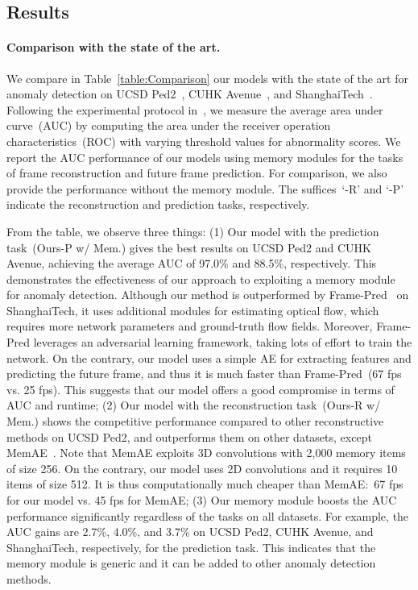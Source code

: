 \documentclass[10pt,twocolumn,letterpaper]{article}
\begin{document}
	\subsection{Results}
\vspace{-0.1cm}    
		\paragraph{Comparison with the state of the art.}
			We compare in Table~\ref{table:Comparison} our models with the state of the art for anomaly detection on UCSD Ped2~\cite{li2013anomaly}, CUHK Avenue~\cite{lu2013abnormal}, and ShanghaiTech~\cite{luo2017revisit}. Following the experimental protocol in~\cite{liu2018future,gong2019memorizing,luo2017revisit}, we measure the average area under curve~(AUC) by computing the area under the receiver operation characteristics~(ROC) with varying threshold values for abnormality scores. We report the AUC performance of our models using memory modules for the tasks of frame reconstruction and future frame prediction. For comparison, we also provide the performance  without the memory module. The suffices~`-R' and `-P' indicate the reconstruction and prediction tasks, respectively. 
			
			From the table, we observe three things: (1) Our model with the prediction task~(Ours-P w/ Mem.) gives the best results on UCSD Ped2 and CUHK Avenue, achieving the average AUC of 97.0\% and 88.5\%, respectively. This demonstrates the effectiveness of our approach to exploiting a memory module for anomaly detection. Although our method is outperformed by Frame-Pred~\cite{liu2018future} on ShanghaiTech, it uses additional modules for estimating optical flow, which requires more network parameters and ground-truth flow fields. Moreover, Frame-Pred leverages an adversarial learning framework, taking lots of effort to train the network. On the contrary, our model uses a simple AE for extracting features and predicting the future frame, and thus it is much faster than Frame-Pred~(67 fps vs. 25 fps). This suggests that our model offers a good compromise in terms of AUC and runtime; (2) Our model with the reconstruction task~(Ours-R w/ Mem.) shows the competitive performance compared to other reconstructive methods on UCSD Ped2, and outperforms them on other datasets, except MemAE~\cite{gong2019memorizing}. Note that MemAE exploits 3D convolutions with 2,000 memory items of size 256. On the contrary, our model uses 2D convolutions and it requires 10 items of size 512. It is thus computationally much cheaper than MemAE:~67 fps for our model vs. 45 fps for MemAE; (3) Our memory module boosts the AUC performance significantly regardless of the tasks on all datasets. For example, the AUC gains are 2.7\%, 4.0\%, and 3.7\% on UCSD Ped2, CUHK Avenue, and ShanghaiTech, respectively, for the prediction task. This indicates that the memory module is generic and it can be added to other anomaly detection methods.
\end{document}
